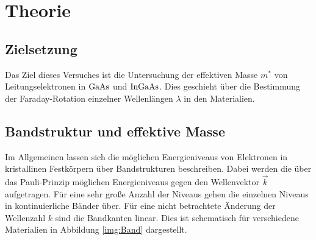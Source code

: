 \section{Theorie}

\subsection{Zielsetzung}

\noindent 
Das Ziel dieses Versuches ist die Untersuchung der effektiven Masse $m^*$ von Leitungselektronen in $\ce{GaAs}$ und $\ce{InGaAs}$. 
Dies geschieht über die Bestimmung der Faraday-Rotation einzelner Wellenlängen $\lambda$ in den Materialien.

\subsection{Bandstruktur und effektive Masse}
       

\noindent
Im Allgemeinen lassen sich die möglichen Energieniveaus von Elektronen in kristallinen Festkörpern über Bandstrukturen beschreiben. 
Dabei werden die über das Pauli-Prinzip möglichen Energieniveaus gegen den Wellenvektor $\vec{k}$ aufgetragen. 
Für eine sehr große Anzahl der Niveaus gehen die einzelnen Niveaus in kontinuierliche Bänder über.
Für eine nicht betrachtete Änderung der Wellenzahl $k$ sind die Bandkanten linear. 
Dies ist schematisch für verschiedene Materialien in Abbildung \ref{img:Band} dargestellt.


